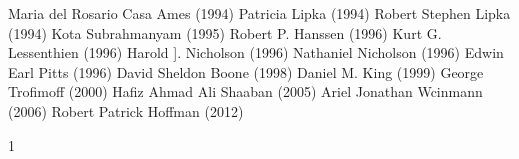\documentclass{memoir}
\begin{document}
\begin{refsegment}
\begin{multicols}{2}
Maria del Rosario Casa Ames (1994)\newline
Patricia Lipka (1994)\newline
Robert Stephen Lipka (1994)\newline
Kota Subrahmanyam (1995)\newline
Robert P. Hanssen (1996)\newline
Kurt G. Lessenthien (1996)\newline
Harold ]. Nicholson (1996)\newline
Nathaniel Nicholson (1996)\newline
Edwin Earl Pitts (1996)\newline
David Sheldon Boone (1998)\newline
Daniel M. King (1999)\newline
George Trofimoff (2000)\newline
Hafiz Ahmad Ali Shaaban (2005)\newline
Ariel Jonathan Wcinmann (2006)\newline
Robert Patrick Hoffman (2012)
\end{multicols}


\newpage
\printbibliography[heading=subbibliography]

\end{refsegment}
1
\end{document}
